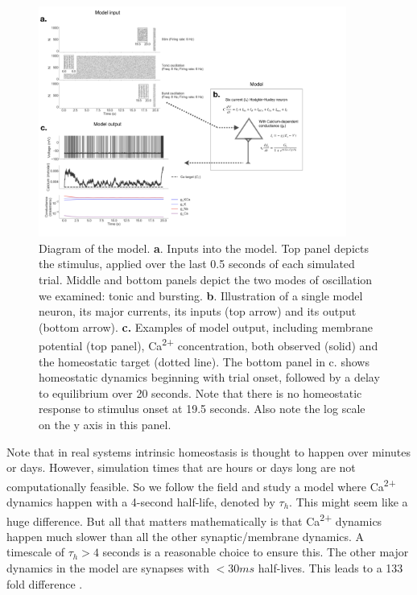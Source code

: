 \documentclass{article}
\begin{document}
\begin{figure}
\centering
\includegraphics[width=0.9\textwidth]{fig1.png}
\caption{\label{fig:f1}
    Diagram of the model. \textbf{a}. Inputs into the model. Top panel depicts the stimulus, applied over the last 0.5 seconds of each simulated trial. Middle and bottom panels depict the two modes of oscillation we examined: tonic and bursting. 
    \textbf{b}. Illustration of a single model neuron, its major currents, its inputs (top arrow) and its output (bottom arrow).
    \textbf{c.} Examples of model output, including membrane potential (top panel), Ca\textsuperscript{2+} concentration, both observed (solid) and the homeostatic target (dotted line). The bottom panel in c. shows homeostatic dynamics beginning with trial onset, followed by a delay to equilibrium over 20 seconds. Note that there is no homeostatic response to stimulus onset at 19.5 seconds. Also note the log scale on the y axis in this panel.
}
\end{figure}

Note that in real systems intrinsic homeostasis is thought to happen over minutes or days. However, simulation times that are hours or days long are not computationally feasible. So we follow the field and study a model where Ca\textsuperscript{2+} dynamics happen with a 4-second half-life, denoted by $\tau_h$. This might seem like a huge difference. But all that matters mathematically is that Ca\textsuperscript{2+} dynamics happen much slower than all the other synaptic/membrane dynamics. A timescale of $\tau_h > 4$ seconds is a reasonable choice to ensure this. The other major dynamics in the model are synapses with $< 30 ms$ half-lives. This leads to a 133 fold difference \cite{Golowasch1999,Marder2014,Marder2015,Gutierrez2013,Marder2014,OLeary2014,LeMasson1993,Abbott1993}.
\end{document}
